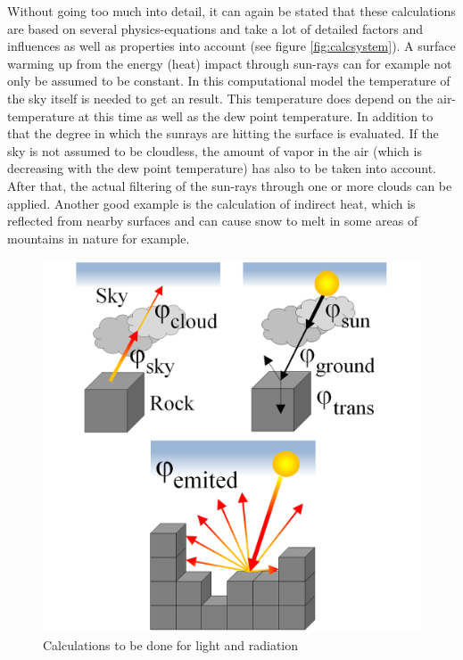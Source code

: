 Without going too much into detail, it can again be stated that these calculations are based on several physics-equations and take a lot of detailed factors and influences as well as properties into account (see figure \ref{fig:calcsystem}). A surface warming up from the energy (heat) impact through sun-rays can for example not only be assumed to be constant. In this computational model the temperature of the sky itself is needed to get an result. This temperature does depend on the air-temperature at this time as well as the dew point temperature. In addition to that the degree in which the sunrays are hitting the surface is evaluated. If the sky is not assumed to be cloudless, the amount of vapor in the air (which is decreasing with the dew point temperature) has also to be taken into account. After that, the actual filtering of the sun-rays through one or more clouds can be applied. Another good example is the calculation of indirect heat, which is reflected from nearby surfaces and can cause snow to melt in some areas of mountains in nature for example.

\begin{figure}[htb]
	\centering
	\includegraphics[width=\linewidth]{BF01/sem_heat_merged2.png}
	\caption{Calculations to be done for light and radiation}
	\label{fig:calcradiation}
\end{figure}


